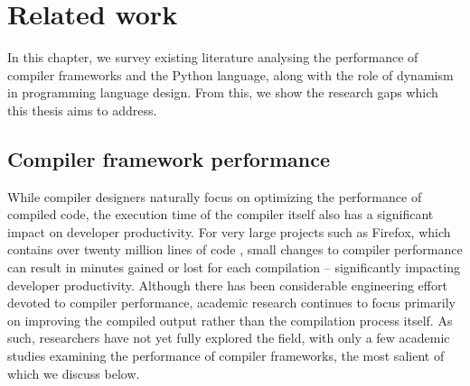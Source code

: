 \chapter{Related work}
\label{chap:related-work}

%
%

In this chapter, we survey existing literature analysing the performance of compiler frameworks and the Python language, along with the role of dynamism in programming language design. From this, we show the research gaps which this thesis aims to address.


\section{Compiler framework performance}
\label{sec:perf-user-extensible-frameworks}

While compiler designers naturally focus on optimizing the performance of compiled code, the execution time of the compiler itself also has a significant impact on developer productivity.
For very large projects such as Firefox, which contains over twenty million lines of code \cite{bastienabadieEngineeringCodeQuality}, small changes to compiler performance can result in minutes gained or lost for each compilation -- significantly impacting developer productivity. Although there has been considerable engineering effort devoted to compiler performance, academic research continues to focus primarily on improving the compiled output rather than the compilation process itself.
As such, researchers have not yet fully explored the field, with only a few academic studies examining the performance of compiler frameworks, the most salient of which we discuss below.

